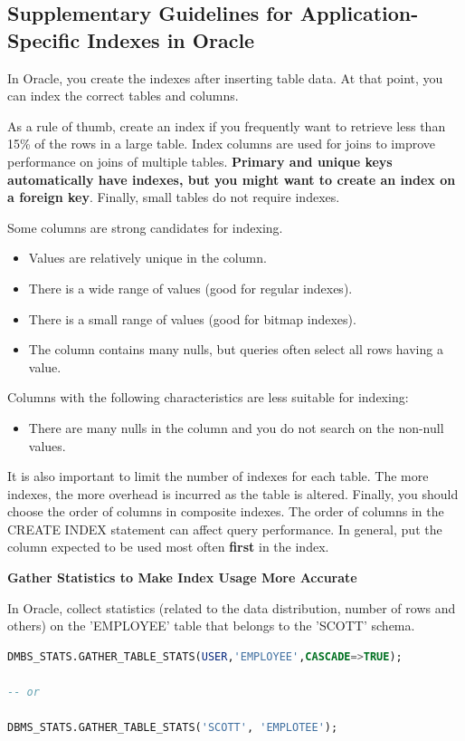 \documentclass[11pt]{article}
\newcommand{\vs}[]{
    \vspace{11pt}
}
\newcommand{\subsec}[1]{
    \vspace{11pt}
    \subsection{#1}
    \vspace{11pt}
}
\newcommand{\boldsec}[1]{
    \vspace{11pt}
    \textbf{#1}
    \vspace{11pt}
}
\begin{document}
\subsec{Supplementary Guidelines for Application-Specific Indexes in Oracle}

In Oracle, you create the indexes after inserting table data. At that point, you can index the correct tables and columns.

As a rule of thumb, create an index if you frequently want to retrieve less than 15\% of the rows in a large table. Index columns are used for joins to improve performance on joins of multiple tables. \textbf{Primary and unique keys automatically have indexes, but you might want to create an index on a foreign key}. Finally, small tables do not require indexes.

Some columns are strong candidates for indexing.
\begin{itemize}
    \item Values are relatively unique in the column.
    \item There is a wide range of values (good for regular indexes).
    \item There is a small range of values (good for bitmap indexes).
    \item The column contains many nulls, but queries often select all rows having a value.
\end{itemize}
\vs

Columns with the following characteristics are less suitable for indexing:
\begin{itemize}
    \item There are many nulls in the column and you do not search on the non-null values.
\end{itemize}
\vs 

It is also important to limit the number of indexes for each table. The more indexes, the more overhead is incurred as the table is altered. Finally, you should choose the order of columns in composite indexes. The order of columns in the CREATE INDEX statement can affect query performance. In general, put the column expected to be used most often \textbf{first} in the index.

\boldsec{Gather Statistics to Make Index Usage More Accurate}

In Oracle, collect statistics (related to the data distribution, number of rows and others) on the 'EMPLOYEE' table that belongs to the 'SCOTT' schema.

\vs
\begin{lstlisting}[language=sql, breaklines=true, showstringspaces=false]
DMBS_STATS.GATHER_TABLE_STATS(USER,'EMPLOYEE',CASCADE=>TRUE);

-- or

DBMS_STATS.GATHER_TABLE_STATS('SCOTT', 'EMPLOTEE');
\end{lstlisting}
\vs
\end{document}
